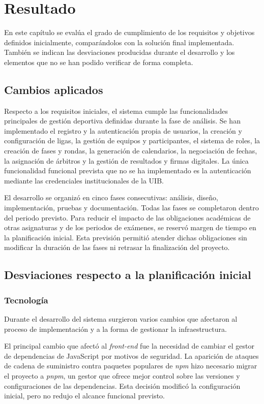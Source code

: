 \chapter{Resultado}
\label{ch:result}
En este capítulo se evalúa el grado de cumplimiento de los requisitos y objetivos definidos inicialmente, comparándolos con la solución final implementada. También se indican las desviaciones producidas durante el desarrollo y los elementos que no se han podido verificar de forma completa.

\section{Cambios aplicados}

Respecto a los requisitos iniciales, el sistema cumple las funcionalidades principales de gestión deportiva definidas durante la fase de análisis. Se han implementado el registro y la autenticación propia de usuarios, la creación y configuración de ligas, la gestión de equipos y participantes, el sistema de roles, la creación de fases y rondas, la generación de calendarios, la negociación de fechas, la asignación de árbitros y la gestión de resultados y firmas digitales. La única funcionalidad funcional prevista que no se ha implementado es la autenticación mediante las credenciales institucionales de la UIB.

El desarrollo se organizó en cinco fases consecutivas: análisis, diseño, implementación, pruebas y documentación. Todas las fases se completaron dentro del periodo previsto. Para reducir el impacto de las obligaciones académicas de otras asignaturas y de los periodos de exámenes, se reservó margen de tiempo en la planificación inicial. Esta previsión permitió atender dichas obligaciones sin modificar la duración de las fases ni retrasar la finalización del proyecto.

\section{Desviaciones respecto a la planificación inicial}

\subsection{Tecnología}
\label{sec:change_tech}
Durante el desarrollo del sistema surgieron varios cambios que afectaron al proceso de implementación y a la forma de gestionar la infraestructura.

El principal cambio que afectó al \emph{front-end} fue la necesidad de cambiar el gestor de dependencias de JavaScript por motivos de seguridad. La aparición de ataques de cadena de suministro \cite{new:tanstack-sca} contra paquetes populares de \emph{npm} hizo necesario migrar el proyecto a \emph{pnpm}, un gestor que ofrece mejor control sobre las versiones y configuraciones de las dependencias. Esta decisión modificó la configuración inicial, pero no redujo el alcance funcional previsto.

